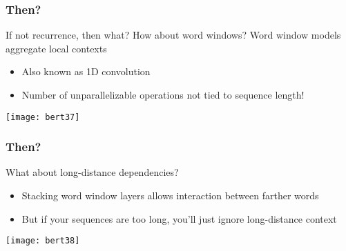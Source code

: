 \begin{frame}[fragile]\frametitle{Then?}

If not recurrence, then what? How about word windows? Word window models aggregate local contexts

\begin{itemize}
\item Also known as 1D convolution
\item Number of unparallelizable operations not tied to sequence length!
\end{itemize}	 

\begin{center}
\texttt{[image: bert37]}
\end{center}	

 
\end{frame}

\begin{frame}[fragile]\frametitle{Then?}

What about long-distance dependencies?

\begin{itemize}
\item Stacking word window layers allows interaction between farther words
\item But if your sequences are too long, you’ll just ignore long-distance context

\end{itemize}	 

\begin{center}
\texttt{[image: bert38]}
\end{center}	

 
\end{frame}

